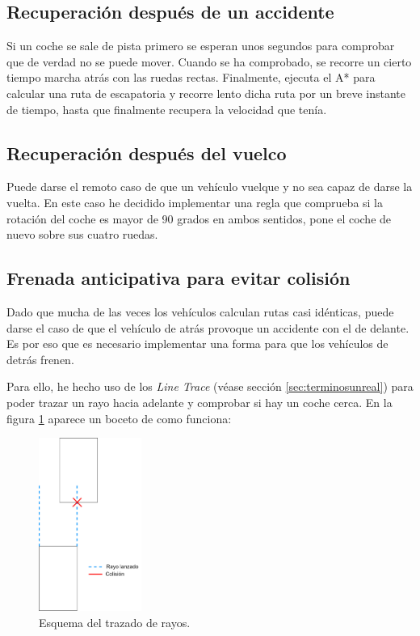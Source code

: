 \subsection{Recuperación después de un accidente}

Si un coche se sale de pista primero se esperan unos segundos para comprobar que de verdad no se puede mover. Cuando se ha comprobado, se recorre un cierto tiempo marcha atrás con las ruedas rectas. Finalmente, ejecuta el A* para calcular una ruta de escapatoria y recorre lento dicha ruta por un breve instante de tiempo, hasta que finalmente recupera la velocidad que tenía.

\subsection{Recuperación después del vuelco}

Puede darse el remoto caso de que un vehículo vuelque y no sea capaz de darse la vuelta. En este caso he decidido implementar una regla que comprueba si la rotación del coche es mayor de 90 grados en ambos sentidos, pone el coche de nuevo sobre sus cuatro ruedas.


\subsection{Frenada anticipativa para evitar colisión}
\label{sec:frenada}

Dado que mucha de las veces los vehículos calculan rutas casi idénticas, puede darse el caso de que el vehículo de atrás provoque un accidente con el de delante. Es por eso que es necesario implementar una forma para que los vehículos de detrás frenen.

\bigskip

Para ello, he hecho uso de los \textit{Line Trace} (véase sección \ref{sec:terminosunreal}) para poder trazar un rayo hacia adelante y comprobar si hay un coche cerca. En la figura \ref{fig:esqlinetrace} aparece un boceto de como funciona:

\begin{figure}[H]
    \centering
    \includegraphics[width=0.3\textwidth]{imagenes/converted/raycast.jpg}
    \caption{Esquema del trazado de rayos.}
    \label{fig:esqlinetrace}
\end{figure}

